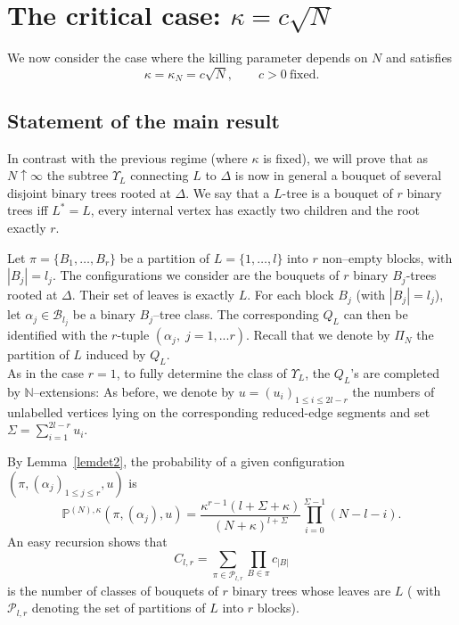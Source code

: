 \documentclass[11pt]{article}
\begin{document}
 
 
 
\section{The critical case: $\kappa=c\sqrt N$}

We now consider the case where the killing parameter depends on $N$ and satisfies
\[
\kappa=\kappa_N=c\sqrt N,
\qquad c>0 \ \text{fixed}.
\]

\subsection{Statement of the main result}

In contrast with the previous regime (where $\kappa$ is fixed), we will prove that as $N\uparrow \infty$ the subtree $\Upsilon_L$ connecting $L$ to $\Delta$ is now in general a bouquet of several disjoint binary trees rooted at
 $\Delta$. We say that a $L$-tree is a bouquet of $r$ binary trees iff $L^*=L$, every internal vertex has exactly two children and the root exactly $r$.
 
\medskip
\noindent
Let $\pi=\{B_1,\dots,B_r\}$ be a partition of $L=\{1,\dots,l\}$ into $r$
non–empty blocks, with $|B_j|=l_j$. The configurations  we consider
are the bouquets  of $r$ binary $B_j$-trees rooted at $\Delta$. Their set of leaves is exactly $L$.
For each block $B_j$ (with $|B_j|=l_j$), let $\alpha_j\in\mathcal B_{l_j}$
be a binary $B_j$–tree class.
 The corresponding $Q_L$ can then be identified with the $r$-tuple $(\alpha_j,\; j=1,...r)$.  Recall that we denote by \(\Pi_N\) the partition of 
\(L\) induced by $Q_L$.\\

\medskip
\noindent
As in the case $r=1$, to fully determine the class of $\Upsilon_L$, the $Q_L$'s are completed by $\mathbb N$–extensions:
As before, we denote by  $u=(u_i)_{1\le i\le 2l-r}$  
the numbers of unlabelled vertices lying on the corresponding reduced-edge
segments
and set $\Sigma=\sum_{i=1}^{2l-r} u_i$.

\medskip
\noindent
By Lemma~\ref{lemdet2}, the probability of a given configuration
$(\pi,(\alpha_j)_{1\le j\le r},u)$ is
\begin{equation}\label{eq:forest-weight}
\mathbb P^{(N),\kappa}
(\pi,(\alpha_j),u)
=
\frac{\kappa^{r-1}(l+\Sigma+\kappa)}
     {(N+\kappa)^{l+\Sigma}}
\prod_{i=0}^{\Sigma-1}(N-l-i).
\end{equation}
An easy recursion shows that 
\[
C_{l,r}
=
\sum_{\pi\in\mathcal P_{l,r}}
\prod_{B\in\pi} c_{|B|}
\]
is the number of classes of bouquets of $r$ binary trees whose leaves are $L$
( with $\mathcal P_{l,r}$ denoting the set of partitions of $L$ into $r$ blocks).
\end{document}
